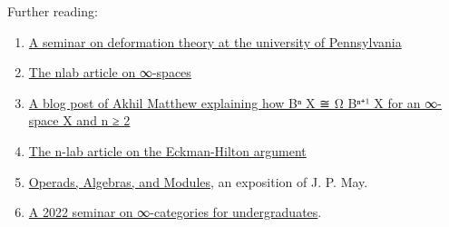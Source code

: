 \documentclass{book}
\theoremstyle{definition}
\begin{document}
Further reading:

\begin{enumerate}
\item \href{https://www.math.upenn.edu/events/seminars/deformation-theory-seminar?field_date_value%5Bvalue%5D%5Byear%5D=}{A seminar on deformation theory at the university of Pennsylvania}
\item \href{https://ncatlab.org/nlab/show/Gamma-space}{The nlab article on ∞-spaces}
\item \href{https://amathew.wordpress.com/2012/09/16/segals-infinite-loop-space-machine/}{A blog post of Akhil Matthew explaining how Bⁿ X ≅ Ω Bⁿ⁺¹ X for an ∞-space X and n ≥ 2}
\item \href{https://ncatlab.org/nlab/show/Eckmann-Hilton+argument#:~:text=In%20its%20original%20form%2C%20the,or%20Groups%20is%20necessarily%20commutative.}{The n-lab article on the Eckman-Hilton argument}
\item \href{http://www.math.uchicago.edu/~may/PAPERS/mayi.pdf}{Operads, Algebras, and Modules}, an exposition of J. P. May.
\item \href{https://www.math.upenn.edu/events/special-seminar-infinity-category-theory-undergraduates}{A 2022 seminar on ∞-categories for undergraduates}. 
\end{enumerate}


\newpage
\ \\
\thispagestyle{empty}
\end{document}
